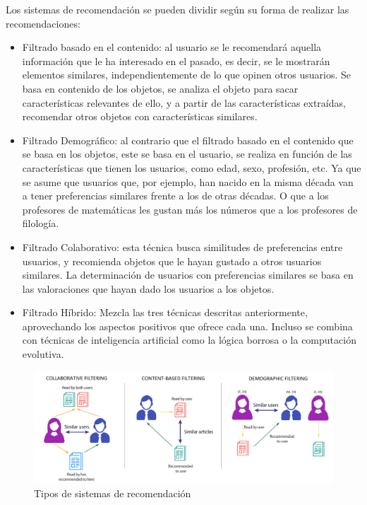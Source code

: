 Los sistemas de recomendación se pueden dividir según su forma de realizar las recomendaciones:

\begin{itemize}
    \item Filtrado basado en el contenido\cite{filtradocontenido}: al usuario se le recomendará aquella información que le ha interesado en el pasado, es decir, se le mostrarán elementos similares, independientemente de lo que opinen otros usuarios. 
    Se basa en contenido de los objetos, se analiza el objeto para sacar características relevantes de ello, y a partir de las características 
    extraídas, recomendar otros objetos con características similares.   
    \item Filtrado Demográfico\cite{filtrademografico}: al contrario que el filtrado basado en el contenido que se basa en los objetos, este se basa en el usuario,
    se realiza en función de las características que tienen los usuarios, como edad, sexo, profesión, etc. Ya que se asume que usuarios que, por ejemplo,
    han nacido en la misma década van a tener preferencias similares frente a los de otras décadas. O que a los profesores de matemáticas les gustan más los números 
    que a los profesores de filología. 
    \item Filtrado Colaborativo\cite{filtradocolaborativo}: esta técnica busca similitudes de preferencias entre usuarios, y recomienda objetos 
    que le hayan gustado a otros usuarios similares. La determinación de usuarios con preferencias similares se basa en 
    las valoraciones que hayan dado los usuarios a los objetos.
    \item Filtrado Híbrido\cite{filtrahibrido}: Mezcla las tres técnicas descritas anteriormente, aprovechando los aspectos positivos
    que ofrece cada una. Incluso se combina con técnicas de inteligencia artificial como la lógica borrosa o la computación evolutiva. 
\end{itemize} 

\begin{figure}[H]
    \centering
    \includegraphics[width=6in, angle=0]{figures/chapter-2/recommendation_systems.png}
    \caption{Tipos de sistemas de recomendación \cite{imagefilters}}
\end{figure}

